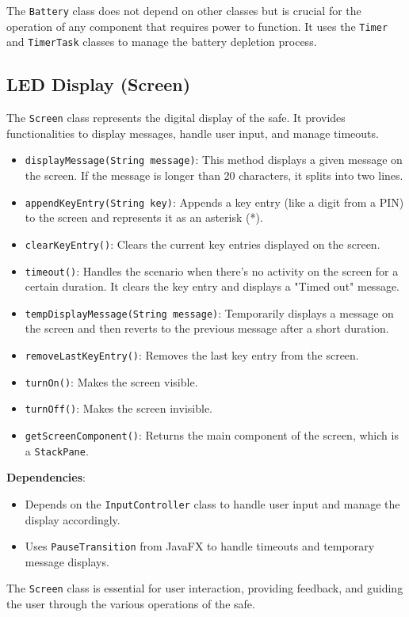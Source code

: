 \documentclass{article}
\begin{document}
The \texttt{Battery} class does not depend on other classes but is crucial for the operation of any component that requires power to function. It uses the \texttt{Timer} and \texttt{TimerTask} classes to manage the battery depletion process.


\subsection{LED Display (Screen)}
The \texttt{Screen} class represents the digital display of the safe. It provides functionalities to display messages, handle user input, and manage timeouts.

\begin{itemize}
    \item \texttt{displayMessage(String message)}: This method displays a given message on the screen. If the message is longer than 20 characters, it splits into two lines.
    \item \texttt{appendKeyEntry(String key)}: Appends a key entry (like a digit from a PIN) to the screen and represents it as an asterisk (*).
    \item \texttt{clearKeyEntry()}: Clears the current key entries displayed on the screen.
    \item \texttt{timeout()}: Handles the scenario when there's no activity on the screen for a certain duration. It clears the key entry and displays a "Timed out" message.
    \item \texttt{tempDisplayMessage(String message)}: Temporarily displays a message on the screen and then reverts to the previous message after a short duration.
    \item \texttt{removeLastKeyEntry()}: Removes the last key entry from the screen.
    \item \texttt{turnOn()}: Makes the screen visible.
    \item \texttt{turnOff()}: Makes the screen invisible.
    \item \texttt{getScreenComponent()}: Returns the main component of the screen, which is a \texttt{StackPane}.
\end{itemize}
\textbf{Dependencies}:
\begin{itemize}
    \item Depends on the \texttt{InputController} class to handle user input and manage the display accordingly.
    \item Uses \texttt{PauseTransition} from JavaFX to handle timeouts and temporary message displays.
\end{itemize}
The \texttt{Screen} class is essential for user interaction, providing feedback, and guiding the user through the various operations of the safe.
\end{document}

